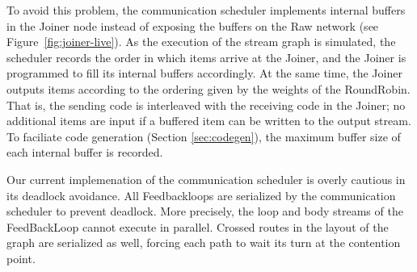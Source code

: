 To avoid this problem, the communication scheduler implements internal
buffers in the Joiner node instead of exposing the buffers on the Raw
network (see Figure~\ref{fig:joiner-live}).  As the execution of the
stream graph is simulated, the scheduler records the order in which
items arrive at the Joiner, and the Joiner is programmed to fill its
internal buffers accordingly.  At the same time, the Joiner outputs
items according to the ordering given by the weights of the
RoundRobin.  That is, the sending code is interleaved with the
receiving code in the Joiner; no additional items are input if a
buffered item can be written to the output stream.  To faciliate code
generation (Section \ref{sec:codegen}), the maximum buffer size of
each internal buffer is recorded.

Our current implemenation of the communication scheduler is overly
cautious in its deadlock avoidance.  All Feedbackloops are serialized
by the communication scheduler to prevent deadlock.  More precisely,
the loop and body streams of the FeedBackLoop cannot execute in
parallel.  Crossed routes in the layout of the graph are serialized as
well, forcing each path to wait its turn at the contention point.
